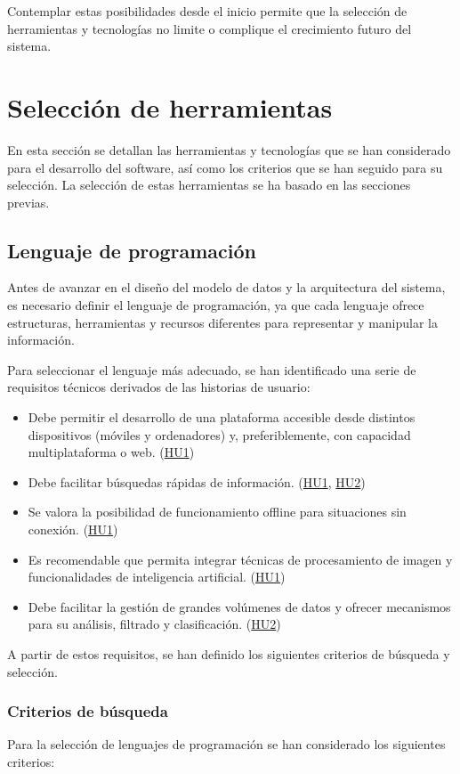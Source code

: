 Contemplar estas posibilidades desde el inicio permite que la selección de herramientas y tecnologías
no limite o complique el crecimiento futuro del sistema.

\section{Selección de herramientas}
En esta sección se detallan las herramientas y tecnologías que se han considerado para el desarrollo
del software, así como los criterios que se han seguido para su selección. La selección de estas
herramientas se ha basado en las secciones previas.

\subsection{Lenguaje de programación}
Antes de avanzar en el diseño del modelo de datos y la arquitectura del sistema, es necesario definir 
el lenguaje de programación, ya que cada lenguaje ofrece estructuras, herramientas y recursos diferentes 
para representar y manipular la información.

Para seleccionar el lenguaje más adecuado, se han identificado una serie de requisitos técnicos derivados
de las historias de usuario:

\begin{itemize}
    \item Debe permitir el desarrollo de una plataforma accesible desde distintos dispositivos 
    (móviles y ordenadores) y, preferiblemente, con capacidad multiplataforma o web. (\hyperref[sec:hu1]{HU1})
    \item Debe facilitar búsquedas rápidas de información. (\hyperref[sec:hu1]{HU1}, \hyperref[sec:hu2]{HU2})
    \item Se valora la posibilidad de funcionamiento offline para situaciones sin conexión. (\hyperref[sec:hu1]{HU1})
    \item Es recomendable que permita integrar técnicas de procesamiento de imagen y funcionalidades de inteligencia artificial. (\hyperref[sec:hu1]{HU1})
    \item Debe facilitar la gestión de grandes volúmenes de datos y ofrecer mecanismos para su análisis, filtrado y clasificación. (\hyperref[sec:hu2]{HU2})
\end{itemize}

A partir de estos requisitos, se han definido los siguientes criterios de búsqueda y selección.


\subsubsection{Criterios de búsqueda}
Para la selección de lenguajes de programación se han considerado los siguientes criterios:

